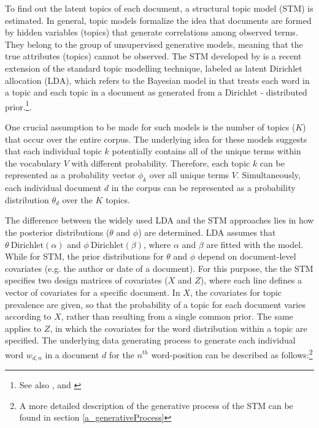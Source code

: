 \documentclass[12pt,a4paper,notitlepage]{article}
\begin{document}
To find out the latent topics of each document, a structural topic model (STM) is estimated. In general, topic models formalize the idea that documents are formed by hidden variables (topics) that generate correlations among observed terms. They belong to the group of unsupervised generative models, meaning that the true attributes (topics) cannot be observed. The STM developed by \citet{roberts_model_2016} is a recent extension of the standard topic modelling technique, labeled as latent Dirichlet allocation (LDA), which refers to the Bayesian model in \citet{blei_latent_2003} that treats each word in a topic and each topic in a document as generated from a Dirichlet - distributed prior.\footnote{See also \citet{griffiths_probabilistic_2002}, \citet{griffiths_finding_2004} and \citet{hofmann_probabilistic_1999}}. 

 One crucial assumption to be made for such models is the number of topics ($K$) that occur over the entire corpus. The underlying idea for these models suggests that each individual topic $k$ potentially contains all of the unique terms within the vocabulary $V$ with different probability. Therefore, each topic $k$ can be represented as a probability vector $\phi_k$ over all unique terms $V$. Simultaneously, each individual document $d$ in the corpus can be represented as a probability distribution $\theta_d$ over the $K$ topics.

The difference between the widely used LDA and the STM approaches lies in how the posterior distributions ($\theta$ and $\phi$) are determined. LDA assumes that $\theta ~ \text{Dirichlet}(\alpha)$ and $\phi ~ \text{Dirichlet}(\beta)$, where $\alpha$ and $\beta$ are fitted with the model. While for STM, the prior distributions for $\theta$ and $\phi$ depend on document-level covariates (e.g. the author or date of a document). For this purpose, the the STM specifies two design matrices of covariates ($X$ and $Z$), where each line defines a vector of covariates for a specific document. In $X$, the covariates for topic prevalence are given, so that the probability of a topic for each document varies according to $X$, rather than resulting from a single common prior. The same applies to $Z$, in which the covariates for the word distribution within a topic are specified. The underlying data generating process to generate each individual word $w_{d,n}$ in a document $d$ for the $n^{th}$ word-position can be described as follows:\footnote{A more detailed description of the generative process of the STM can be found in section \ref{a_generativeProcess}}
\end{document}
